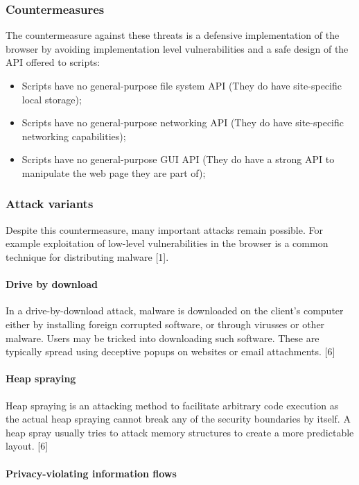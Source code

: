 \subsubsection{Countermeasures}

The countermeasure against these threats is a defensive implementation of the browser by avoiding implementation level vulnerabilities and a safe design of the API offered to scripts:
\begin{itemize}
	\item Scripts have no general-purpose file system API (They do have site-specific local storage);
	\item Scripts have no general-purpose networking API (They do have site-specific networking capabilities);
	\item Scripts have no general-purpose GUI API (They do have a strong API to manipulate the web page they are part of);
\end{itemize}

\subsubsection{Attack variants}

Despite this countermeasure, many important attacks remain possible. For example exploitation of low-level vulnerabilities in the browser is a common technique for distributing malware [1].


\paragraph{Drive by download}

In a drive-by-download attack, malware is downloaded on the client's computer either by installing foreign corrupted software, or through virusses or other malware. Users may be tricked into downloading such software. These are typically spread using deceptive popups on websites or email attachments. [6]


\paragraph{Heap spraying}

Heap spraying is an attacking method to facilitate arbitrary code execution as the actual heap spraying cannot break any of the security boundaries by itself. A heap spray usually tries to attack memory structures to create a more predictable layout. [6]


\paragraph{Privacy-violating information flows}

